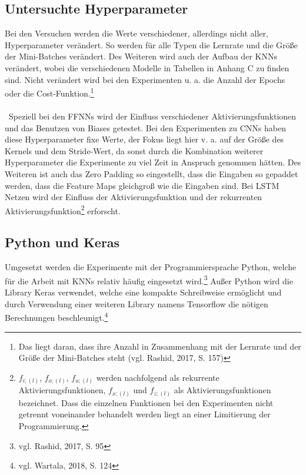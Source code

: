 \documentclass[
	a4paper,
	12pt,
	ngerman,
	oneside
]{scrreprt}											%
\begin{document}
			\subsection{Untersuchte Hyperparameter}
				Bei den Versuchen werden die Werte verschiedener, allerdings nicht aller, Hyperparameter verändert. So werden für alle Typen die Lernrate und die Größe der Mini-Batches verändert. Des Weiteren wird auch der Aufbau der KNNs verändert, wobei die verschiedenen Modelle in Tabellen in Anhang C zu finden sind. Nicht verändert wird bei den Experimenten u. a. die Anzahl der Epochs oder die Cost-Funktion.\footnote{Das liegt daran, dass ihre Anzahl in Zusammenhang mit der Lernrate und der Größe der Mini-Batches steht (vgl. Rashid, 2017, S. 157)} 
				\\ \ \\ \
				Speziell bei den FFNNs wird der Einfluss verschiedener Aktivierungsfunktionen und das Benutzen von Biases getestet. Bei den Experimenten zu CNNs haben diese Hyperparameter fixe Werte, der Fokus liegt hier v. a. auf der Größe des Kernels und dem Stride-Wert, da sonst durch die Kombination weiterer Hyperparameter die Experimente zu viel Zeit in Anspruch genommen hätten. Des Weiteren ist auch das Zero Padding so eingestellt, dass die Eingaben so gepaddet werden, dass die Feature Maps gleichgroß wie die Eingaben sind. Bei LSTM Netzen wird der Einfluss der Aktivierungsfunktion und der rekurrenten Aktivierungsfunktion\footnote{$f_{i;(l)}$, $f_{o;(l)}$, $f_{u;(l)}$ werden nachfolgend als rekurrente Aktivierungsfunktionen, $f_{x;(l)}$ und $f_{z;(l)}$ als Aktivierungsfunktionen bezeichnet. Dass die einzelnen Funktionen bei den Experimenten nicht getrennt voneinander behandelt werden liegt an einer Limitierung der Programmierung.} erforscht.
	
			\subsection{Python und Keras}\label{Python&Keras}
				Umgesetzt werden die Experimente mit der Programmiersprache Python, welche für die Arbeit mit KNNs relativ häufig eingesetzt wird.\footnote{vgl. Rashid, 2017, S. 95} Außer Python wird die Library Keras verwendet, welche eine kompakte Schreibweise ermöglicht und durch Verwendung einer weiteren Library namens Tensorflow die nötigen Berechnungen beschleunigt.\footnote{vgl. Wartala, 2018, S. 124}
				
\end{document}
